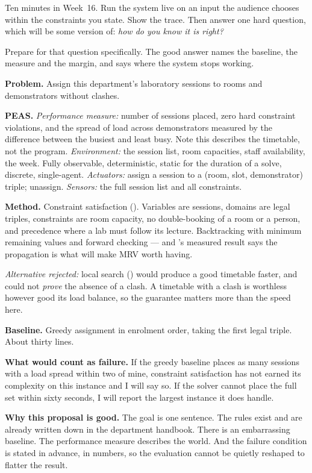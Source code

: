 Ten minutes in Week~16. Run the system live on an input the audience chooses within
the constraints you state. Show the trace. Then answer one hard question, which will
be some version of: \emph{how do you know it is right?}

Prepare for that question specifically. The good answer names the baseline, the
measure and the margin, and says where the system stops working.

\begin{worked}
\textbf{Problem.} Assign this department's laboratory sessions to rooms and
demonstrators without clashes.

\smallskip
\textbf{PEAS.} \emph{Performance measure:} number of sessions placed, zero hard
constraint violations, and the spread of load across demonstrators measured by the
difference between the busiest and least busy. Note this describes the timetable,
not the program. \emph{Environment:} the session list, room capacities, staff
availability, the week. Fully observable, deterministic, static for the duration of
a solve, discrete, single-agent. \emph{Actuators:} assign a session to a
(room, slot, demonstrator) triple; unassign. \emph{Sensors:} the full session list
and all constraints.

\smallskip
\textbf{Method.} Constraint satisfaction (). Variables are sessions,
domains are legal triples, constraints are room capacity, no double-booking of a
room or a person, and precedence where a lab must follow its lecture. Backtracking
with minimum remaining values and forward checking --- and 's measured
result says the propagation is what will make MRV worth having.

\emph{Alternative rejected:} local search () would produce a good
timetable faster, and could not \emph{prove} the absence of a clash. A timetable
with a clash is worthless however good its load balance, so the guarantee matters
more than the speed here.

\smallskip
\textbf{Baseline.} Greedy assignment in enrolment order, taking the first legal
triple. About thirty lines.

\smallskip
\textbf{What would count as failure.} If the greedy baseline places as many sessions
with a load spread within two of mine, constraint satisfaction has not earned its
complexity on this instance and I will say so. If the solver cannot place the full
set within sixty seconds, I will report the largest instance it does handle.

\smallskip
\textbf{Why this proposal is good.} The goal is one sentence. The rules exist and
are already written down in the department handbook. There is an embarrassing
baseline. The performance measure describes the world. And the failure condition is
stated in advance, in numbers, so the evaluation cannot be quietly reshaped to
flatter the result.
\end{worked}

